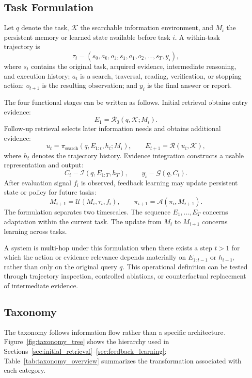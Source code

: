 \subsection{Task Formulation}
\label{subsec:task_formulation}

Let $q$ denote the task, $\mathcal{K}$ the searchable information environment, and $M_i$ the persistent memory or learned state available before task $i$. A within-task trajectory is
\[
\tau_i = (s_0,a_0,o_1,s_1,a_1,o_2,\ldots,s_T,y_i),
\]
where $s_t$ contains the original task, acquired evidence, intermediate reasoning, and execution history; $a_t$ is a search, traversal, reading, verification, or stopping action; $o_{t+1}$ is the resulting observation; and $y_i$ is the final answer or report.

The four functional stages can be written as follows. Initial retrieval obtains entry evidence:
\[
E_1 = \mathcal{R}_0(q,\mathcal{K};M_i).
\]
Follow-up retrieval selects later information needs and obtains additional evidence:
\[
u_t = \pi_{\mathrm{search}}(q,E_{1:t},h_t;M_i), \qquad
E_{t+1}=\mathcal{R}(u_t,\mathcal{K}),
\]
where $h_t$ denotes the trajectory history. Evidence integration constructs a usable representation and output:
\[
C_i = \mathcal{I}(q,E_{1:T},h_T), \qquad
 y_i = \mathcal{G}(q,C_i).
\]
After evaluation signal $f_i$ is observed, feedback learning may update persistent state or policy for future tasks:
\[
M_{i+1}=\mathcal{U}(M_i,\tau_i,f_i),
\qquad
\pi_{i+1}=\mathcal{A}(\pi_i,M_{i+1}).
\]
The formulation separates two timescales. The sequence $E_1,\ldots,E_T$ concerns adaptation within the current task. The update from $M_i$ to $M_{i+1}$ concerns learning across tasks.

A system is multi-hop under this formulation when there exists a step $t>1$ for which the action or evidence relevance depends materially on $E_{1:t-1}$ or $h_{t-1}$, rather than only on the original query $q$. This operational definition can be tested through trajectory inspection, controlled ablations, or counterfactual replacement of intermediate evidence.

\subsection{Taxonomy}
\label{subsec:taxonomy}

The taxonomy follows information flow rather than a specific architecture. Figure~\ref{fig:taxonomy_tree} shows the hierarchy used in Sections~\ref{sec:initial_retrieval}--\ref{sec:feedback_learning}; Table~\ref{tab:taxonomy_overview} summarizes the transformation associated with each category.

